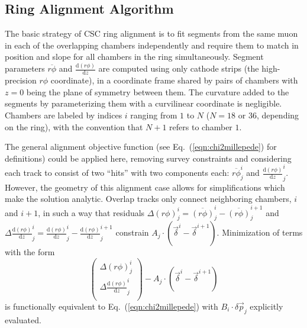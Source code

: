 \documentclass[11pt,twoside,a4paper,cmspaper]{cms-tdr}
\begin{document}
\subsection{Ring Alignment Algorithm}

The basic strategy of CSC ring alignment is to fit 
segments from the same muon in each of the overlapping chambers
independently and require them to match in position and slope for all
chambers in the ring simultaneously.  Segment parameters
$\overline{r\phi}$ and $\frac{\textrm{d}(r\phi)}{\textrm{d}z}$ are computed using only
cathode strips (the high-precision $r\phi$ coordinate), in a
coordinate frame shared by pairs of chambers with $z=0$ being the
plane of symmetry between them.  The curvature added to the segments
by parameterizing them with a curvilinear coordinate is negligible.
Chambers are labeled by indices $i$ ranging from $1$ to $N$ ($N=18$ or
$36$, depending on the ring), with the convention that $N+1$ refers to
chamber $1$.

The general alignment objective function (see
Eq.~(\ref{eqn:chi2millepede}) for definitions) could be applied here,
removing survey constraints and considering each track to consist of
two ``hits'' with two components each: $\overline{r\phi}^i_j$ and
$\frac{\textrm{d}(r\phi)}{\textrm{d}z}^i_j$.  However, the geometry of this
alignment case allows for simplifications which make the solution
analytic.  Overlap tracks only connect neighboring chambers, $i$ and
$i+1$, in such a way that residuals $\Delta (r\phi)^i_j
= \overline{(r\phi)}^i_j - \overline{(r\phi)}^{i+1}_j$ and
$\Delta \frac{\textrm{d}(r\phi)}{\textrm{d}z}^i_j = \frac{\textrm{d}(r\phi)}{\textrm{d}z}^i_j
- \frac{\textrm{d}(r\phi)}{\textrm{d}z}^{i+1}_j$ constrain
$A_j \cdot \left(\vec{\delta}^i - \vec{\delta}^{i+1}\right)$.
Minimization of terms with the form
\begin{equation}
\left(\begin{array}{c}
\Delta (r\phi)^i_j \\
\Delta \frac{\textrm{d}(r\phi)}{\textrm{d}z}^i_j \\
\end{array} \right) - A_j \cdot \left(\vec{\delta}^i - \vec{\delta}^{i+1}\right)
\end{equation}
is functionally equivalent to Eq.~(\ref{eqn:chi2millepede}) with
$B_i \cdot \delta \vec{p}_j$ explicitly evaluated.
\end{document}
